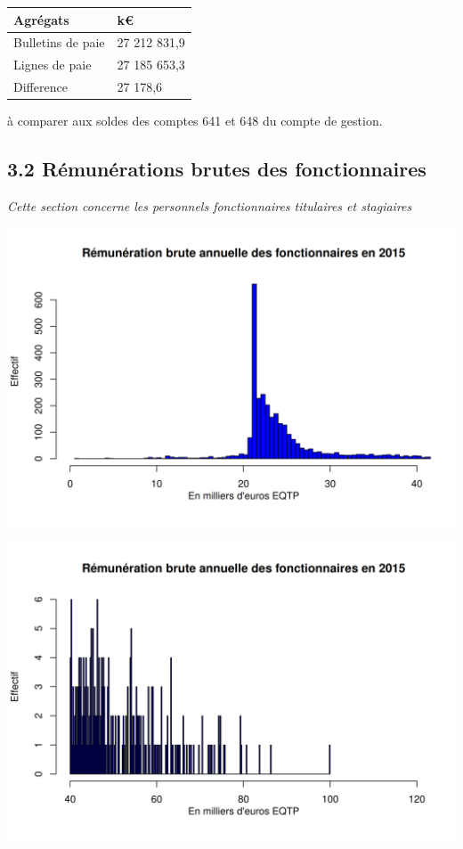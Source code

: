 \begin{longtable}[]{@{}ll@{}}
\toprule
Agrégats & k€\tabularnewline
\midrule
\endhead
Bulletins de paie & 27 212 831,9\tabularnewline
Lignes de paie & 27 185 653,3\tabularnewline
Difference & 27 178,6\tabularnewline
\bottomrule
\end{longtable}

à comparer aux soldes des comptes 641 et 648 du compte de gestion.

\hypertarget{remunerations-brutes-des-fonctionnaires-1}{%
\subsection{3.2 Rémunérations brutes des
fonctionnaires}\label{remunerations-brutes-des-fonctionnaires-1}}

\emph{Cette section concerne les personnels fonctionnaires titulaires et
stagiaires}

\includegraphics{altair_files/figure-latex/unnamed-chunk-76-1.png}

\includegraphics{altair_files/figure-latex/unnamed-chunk-76-2.png}

